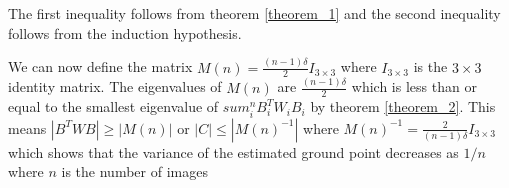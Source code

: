 \documentclass[]{article}
\begin{document}
The first inequality follows from theorem \ref{theorem_1} and the second inequality follows from the induction hypothesis.  

We can now define the matrix $M(n) = \frac{(n-1)\delta}{2}I_{3 \times 3}$ where $I_{3\times 3}$ is the $3 \times 3$ identity matrix.  The eigenvalues of $M(n)$ are $\frac{(n-1)\delta}{2}$ which is less than or equal to the smallest eigenvalue of $sum^n_i B^T_iW_iB_i$ by theorem \ref{theorem_2}.  This means $|B^TWB| \geq |M(n)|$ or $|C| \leq |M(n)^{-1}|$ where $M(n)^{-1} = \frac{2}{(n-1)\delta}I_{3\times 3}$ which shows that the variance of the estimated ground point decreases as $1/n$ where $n$ is the number of images
\end{document}
